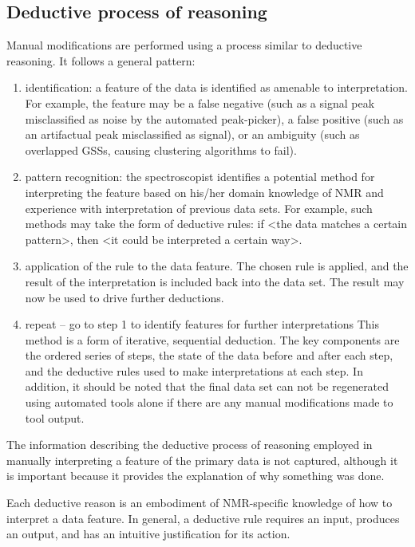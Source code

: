 \subsection*{Deductive process of reasoning}
Manual modifications are performed using a process similar to deductive 
reasoning.  It follows a general pattern:
\begin{enumerate}
  \item identification: a feature of the data is identified as amenable to 
    interpretation.  For example, the feature may be a false negative (such as 
    a signal peak misclassified as noise by the automated peak-picker), a false 
    positive (such as an artifactual peak misclassified as signal), or an 
    ambiguity (such as overlapped GSSs, causing clustering algorithms to fail).
  \item pattern recognition: the spectroscopist identifies a potential method 
    for interpreting the feature based on his/her domain knowledge of NMR and 
    experience with interpretation of previous data sets.  For example, such 
    methods may take the form of deductive rules:  if <the data matches a 
    certain pattern>, then <it could be interpreted a certain way>. 
  \item application of the rule to the data feature.  The chosen rule is 
    applied, and the result of the interpretation is included back into the 
    data set.  The result may now be used to drive further deductions.
  \item repeat -- go to step 1 to identify features for further interpretations
    This method is a form of iterative, sequential deduction.  The key components 
    are the ordered series of steps, the state of the data before and after each 
    step, and the deductive rules used to make interpretations at each step.  
    In addition, it should be noted that the final data set can not be 
    regenerated using automated tools alone if there are any manual 
    modifications made to tool output.
\end{enumerate}

The information describing the deductive process of reasoning employed in 
manually interpreting a feature of the primary data is not captured, although
it is important because it provides the explanation 
of why something was done.

Each deductive reason is an embodiment of NMR-specific knowledge of how to 
interpret a data feature.  In general, a deductive rule requires an input, 
produces an output, and has an intuitive justification for its action.

